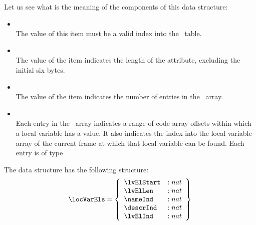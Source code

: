 Let us see what is the meaning of the components of this data structure:
\begin{itemize}
\item  \nameInd \\
    The value of this item must be a valid index into the \constantPool \ table.

 \item \attLen \\
    The value of the item indicates the length of the attribute, excluding the initial six bytes.

 \item \lvLength \\
    The value of the item indicates the number of entries in the  \lvTab \  array.

\item \lvTab\\
    Each entry in the \lvTab \  array indicates a range of code array
    offsets within which a local variable has a value. It also indicates the index into the
    local variable array of the current frame at which that local variable can be found.
    Each entry is of type  \locVarEls
\end{itemize}



The data structure \locVarEls has the following structure:
$$\locVarEls  = \left\{\begin{array}{ll}  \lvElStart  & :   nat \\
                                          \lvElLen  & :  nat \\
					  \nameInd  & : nat \\
					 \descrInd & : nat \\
					\lvElInd & : nat \\
	                        \end{array} \right\} $$

